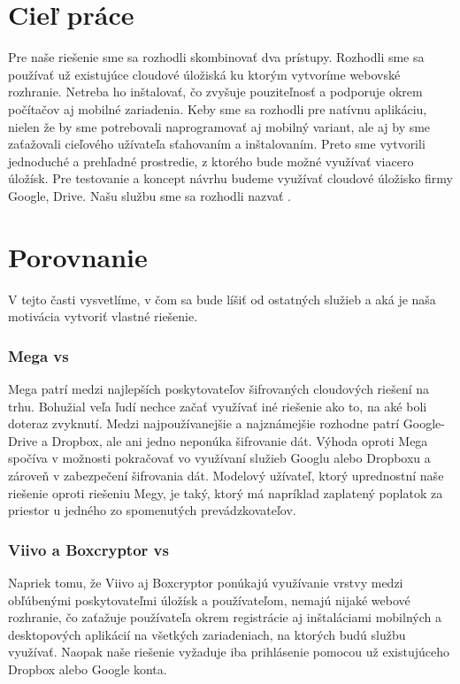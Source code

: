 \section{Cieľ práce}
	Pre naše riešenie sme sa rozhodli skombinovať dva prístupy. Rozhodli sme sa používať už existujúce cloudové úložiská ku ktorým vytvoríme webovské rozhranie. Netreba ho inštalovať, čo zvyšuje pouziteľnosť a podporuje okrem počítačov aj mobilné zariadenia. Keby sme sa rozhodli pre natívnu aplikáciu, nielen že by sme potrebovali naprogramovať aj mobilný variant, ale aj by sme zaťažovali cieľového užívateľa sťahovaním a inštalovaním. Preto sme vytvorili jednoduché a prehľadné prostredie, z ktorého bude možné využívať viacero úložísk. Pre testovanie a koncept návrhu budeme využívať cloudové úložisko firmy Google, Drive. Našu službu sme sa rozhodli nazvať \serviceName.

\section{Porovnanie}
	V tejto časti vysvetlíme, v čom sa bude \serviceName líšiť od ostatných služieb a aká je naša motivácia vytvoriť vlastné riešenie.
	\subsubsection{Mega vs \serviceName}
	Mega patrí medzi najlepších poskytovateľov šifrovaných cloudových riešení na trhu. Bohužial veľa ľudí nechce začať využívať iné riešenie ako to, na aké boli doteraz zvyknutí. Medzi najpoužívanejšie a najznámejšie rozhodne patrí Google-Drive a Dropbox, ale ani jedno neponúka šifrovanie dát. Výhoda \serviceName oproti Mega spočíva v možnosti pokračovať vo využívaní služieb Googlu alebo Dropboxu a zároveň v zabezpečení šifrovania dát. Modelový užívateľ, ktorý uprednostní naše riešenie oproti riešeniu Megy, je taký, ktorý má napríklad zaplatený poplatok za priestor u jedného zo spomenutých prevádzkovateľov.
	
	\subsubsection{Viivo a Boxcryptor vs \serviceName}
	Napriek tomu, že Viivo aj Boxcryptor ponúkajú využívanie vrstvy medzi obľúbenými poskytovateľmi úložísk a používateľom, nemajú nijaké webové rozhranie, čo zaťažuje používateľa okrem registrácie aj inštaláciami mobilných a desktopových aplikácií na všetkých zariadeniach, na ktorých budú službu využívať. Naopak naše riešenie vyžaduje iba prihlásenie pomocou už existujúceho Dropbox alebo Google konta.